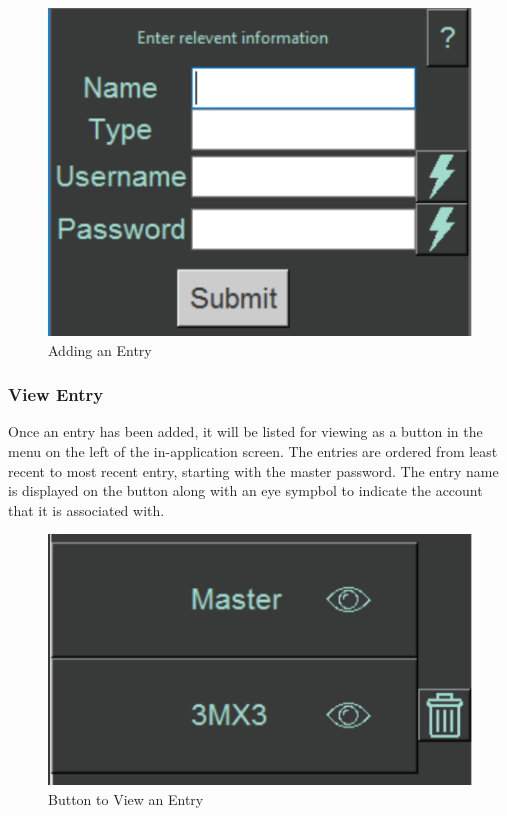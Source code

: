 \documentclass[12pt, titlepage]{article}
\begin{document}
\begin{figure}[h]
	\centering
	\includegraphics[scale=1.0]{images/AddEntry.PNG}
	\caption{Adding an Entry}
	\label{fig:AdEnt}
\end{figure}

\subsubsection{View Entry} \label{ViewEnt}

Once an entry has been added, it will be listed for viewing as a button in the menu on the left of the in-application screen. The entries are ordered from least recent to most recent entry, starting with the master password. The entry name is displayed on the button along with an eye sympbol to indicate the account that it is associated with.

\begin{figure}[h]
	\centering
	\includegraphics[scale=1.0]{images/ViewEntry.PNG}
	\caption{Button to View an Entry}
	\label{fig:VieEnt1}
\end{figure}
\end{document}
